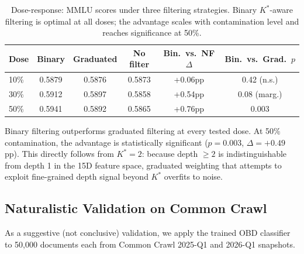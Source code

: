 \documentclass[11pt]{article}
\newcommand{\kstar}{K^{*}}
\begin{document}
\begin{table}[t]
\centering
\caption{Dose-response: MMLU scores under three filtering strategies. Binary $\kstar$-aware filtering is optimal at all doses; the advantage scales with contamination level and reaches significance at 50\%.}
\label{tab:dose}
\small
\begin{tabular}{lccccc}
\toprule
\textbf{Dose} & \textbf{Binary} & \textbf{Graduated} & \textbf{No filter} & \textbf{Bin.\ vs.\ NF $\Delta$} & \textbf{Bin.\ vs.\ Grad.\ $p$} \\
\midrule
10\% & 0.5879 & 0.5876 & 0.5873 & +0.06pp & 0.42 (n.s.) \\
30\% & 0.5912 & 0.5897 & 0.5858 & +0.54pp & 0.08 (marg.) \\
50\% & 0.5941 & 0.5892 & 0.5865 & +0.76pp & 0.003 \\
\bottomrule
\end{tabular}
\end{table}

Binary filtering outperforms graduated filtering at every tested dose. At 50\% contamination, the advantage is statistically significant ($p = 0.003$, $\Delta = +0.49$pp). This directly follows from $\kstar = 2$: because depth $\geq 2$ is indistinguishable from depth 1 in the 15D feature space, graduated weighting that attempts to exploit fine-grained depth signal beyond $\kstar$ overfits to noise.

\subsection{Naturalistic Validation on Common Crawl}
\label{sec:cc}

As a suggestive (not conclusive) validation, we apply the trained OBD classifier to 50,000 documents each from Common Crawl 2025-Q1 and 2026-Q1 snapshots.
\end{document}
